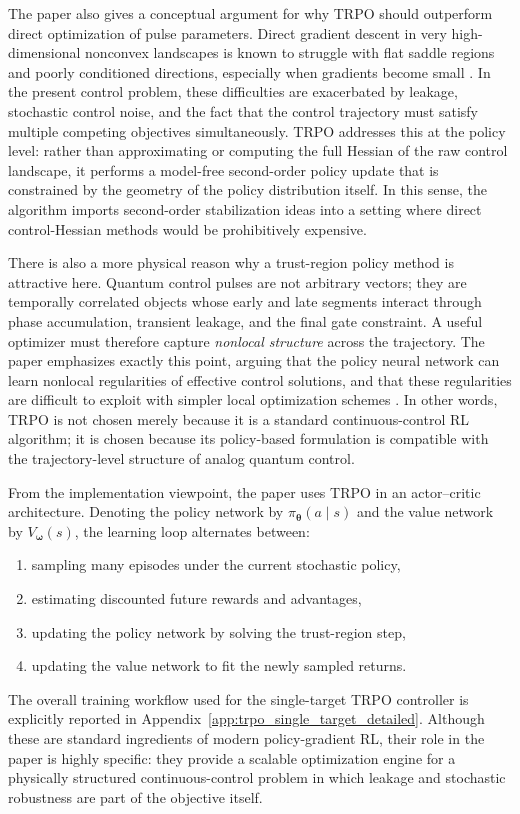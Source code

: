The paper also gives a conceptual argument for why TRPO should outperform direct optimization of pulse parameters. Direct gradient descent in very high-dimensional nonconvex landscapes is known to struggle with flat saddle regions and poorly conditioned directions, especially when gradients become small \cite{Niu2019}. In the present control problem, these difficulties are exacerbated by leakage, stochastic control noise, and the fact that the control trajectory must satisfy multiple competing objectives simultaneously. TRPO addresses this at the policy level: rather than approximating or computing the full Hessian of the raw control landscape, it performs a model-free second-order policy update that is constrained by the geometry of the policy distribution itself. In this sense, the algorithm imports second-order stabilization ideas into a setting where direct control-Hessian methods would be prohibitively expensive.

There is also a more physical reason why a trust-region policy method is attractive here. Quantum control pulses are not arbitrary vectors; they are temporally correlated objects whose early and late segments interact through phase accumulation, transient leakage, and the final gate constraint. A useful optimizer must therefore capture \emph{nonlocal structure} across the trajectory. The paper emphasizes exactly this point, arguing that the policy neural network can learn nonlocal regularities of effective control solutions, and that these regularities are difficult to exploit with simpler local optimization schemes \cite{Niu2019}. In other words, TRPO is not chosen merely because it is a standard continuous-control RL algorithm; it is chosen because its policy-based formulation is compatible with the trajectory-level structure of analog quantum control.

From the implementation viewpoint, the paper uses TRPO in an actor--critic architecture. Denoting the policy network by \(\pi_{\bm{\theta}}(a\mid s)\) and the value network by \(V_{\bm{\omega}}(s)\), the learning loop alternates between:
\begin{enumerate}
\item sampling many episodes under the current stochastic policy,
\item estimating discounted future rewards and advantages,
\item updating the policy network by solving the trust-region step,
\item updating the value network to fit the newly sampled returns.
\end{enumerate}
The overall training workflow used for the single-target TRPO controller is explicitly reported in Appendix~\ref{app:trpo_single_target_detailed}.
Although these are standard ingredients of modern policy-gradient RL, their role in the paper is highly specific: they provide a scalable optimization engine for a physically structured continuous-control problem in which leakage and stochastic robustness are part of the objective itself.

